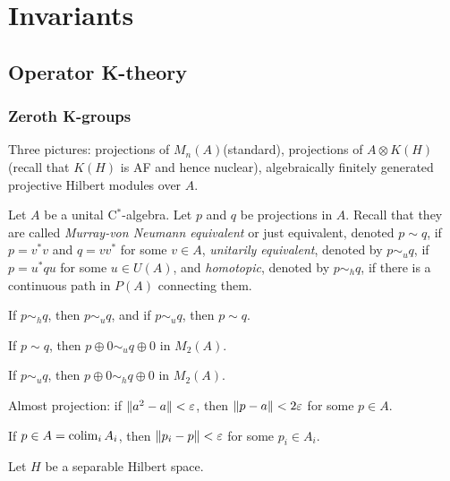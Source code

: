 \documentclass{../../large}
\begin{document}
\part{Invariants}
\chapter{Operator K-theory}

\section{Zeroth K-groups}
Three pictures: projections of $M_n(A)$(standard), projections of $A\otimes K(H)$(recall that $K(H)$ is AF and hence nuclear), algebraically finitely generated projective Hilbert modules over $A$.


\begin{prb}
Let $A$ be a unital C$^*$-algebra.
Let $p$ and $q$ be projections in $A$.
Recall that they are called \emph{Murray-von Neumann equivalent} or just equivalent, denoted $p\sim q$, if $p=v^*v$ and $q=vv^*$ for some $v\in A$, \emph{unitarily equivalent}, denoted by $p\sim_uq$, if $p=u^*qu$ for some $u\in U(A)$, and \emph{homotopic}, denoted by $p\sim_hq$, if there is a continuous path in $P(A)$ connecting them.
\begin{parts}
\item If $p\sim_hq$, then $p\sim_uq$, and if $p\sim_uq$, then $p\sim q$.
\item If $p\sim q$, then $p\oplus0\sim_uq\oplus0$ in $M_2(A)$.
\item If $p\sim_uq$, then $p\oplus0\sim_hq\oplus0$ in $M_2(A)$.
\end{parts}
\end{prb}


Almost projection: if $\|a^2-a\|<\varepsilon$, then $\|p-a\|<2\varepsilon$ for some $p\in A$.

If $p\in A=\operatorname*{colim}_i A_i$, then $\|p_i-p\|<\varepsilon$ for some $p_i\in A_i$.


\begin{prb}[Properties of $K(H)$]
Let $H$ be a separable Hilbert space.


\end{prb}
\end{document}
